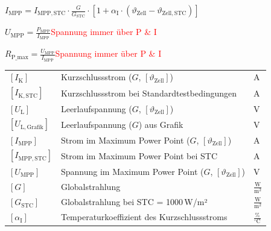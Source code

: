 $\boxed{
I_{\mathrm{MPP}} = I_{\mathrm{MPP},\mathrm{STC}} \cdot \frac{G}{G_{\mathrm{STC}}} \cdot \left[1 + \alpha_{\mathrm{I}} \cdot \left(\vartheta_{\mathrm{Zell}} - \vartheta_{\mathrm{Zell},\mathrm{STC}}\right) \right]
}$

$\boxed{
U_{\mathrm{MPP}} = \frac{P_{\mathrm{MPP}}}{I_{\mathrm{MPP}}}
}$\quad \textcolor{red}{Spannung immer über P \& I}

$\boxed{
R_{\mathrm{P\_max}} = \frac{U_{\mathrm{MPP}}}{I_{\mathrm{MPP}}}
}$\quad \textcolor{red}{Spannung immer über P \& I}

\vspace{0.1cm}

\renewcommand{\arraystretch}{1.2} %
\begin{tabular}{@{} l p{7cm} l @{}}
    $[I_{\mathrm{K}}]$                           & Kurzschlussstrom ($G$, $[\vartheta_{\mathrm{Zell}}]$) \dotfill                & $\mathrm{A}$ \\
    $[I_{\mathrm{K},\mathrm{STC}}]$              & Kurzschlussstrom bei Standardtestbedingungen \dotfill                         & $\mathrm{A}$ \\
    $[U_{\mathrm{L}}]$                           & Leerlaufspannung ($G$, $[\vartheta_{\mathrm{Zell}}]$) \dotfill                & $\mathrm{V}$ \\
    $[U_{\mathrm{L},\mathrm{Grafik}}]$           & Leerlaufspannung ($G$) aus Grafik \dotfill                                    & $\mathrm{V}$ \\
    $[I_{\mathrm{MPP}}]$                         & Strom im Maximum Power Point ($G$, $[\vartheta_{\mathrm{Zell}}]$) \dotfill    & $\mathrm{A}$ \\
    $[I_{\mathrm{MPP},\mathrm{STC}}]$            & Strom im Maximum Power Point bei STC \dotfill                                 & $\mathrm{A}$ \\
    $[U_{\mathrm{MPP}}]$                         & Spannung im Maximum Power Point ($G$, $[\vartheta_{\mathrm{Zell}}]$) \dotfill & $\mathrm{V}$ \\
    $[G]$                                        & Globalstrahlung \dotfill                                                      & $\frac{\mathrm{W}}{\mathrm{m^2}}$ \\
    $[G_{\mathrm{STC}}]$                         & Globalstrahlung bei STC = 1000\,W/m² \dotfill                                 & $\frac{\mathrm{W}}{\mathrm{m^2}}$ \\
    $[\alpha_{\mathrm{I}}]$                      & Temperaturkoeffizient des Kurzschlussstroms \dotfill                          & $\frac{\%}{^\circ\mathrm{C}}$ \\

\end{tabular}
